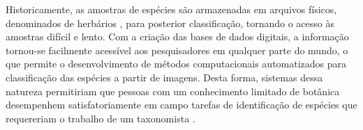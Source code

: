 Historicamente, as amostras de espécies são armazenadas em arquivos físicos, denominados de herbários \cite{Cope20127562}, para posterior classificação, tornando o acesso às amostras difícil e lento. Com a criação das bases de dados digitais, a informação tornou-se facilmente acessível aos pesquisadores em qualquer parte do mundo, o que permite o desenvolvimento de métodos computacionais automatizados para classificação das espécies a partir de imagens. Desta forma, sistemas dessa natureza permitiriam que pessoas com um conhecimento limitado de botânica desempenhem satisfatoriamente em campo tarefas de identificação de espécies que requereriam o trabalho de um taxonomista \cite{Cope20127562}.  




 




